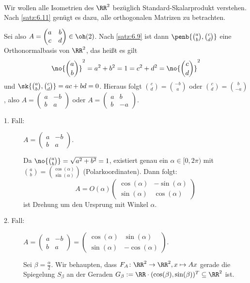 \begin{anwendung}
	\label{anw:6.12}
	Wir wollen alle Isometrien des $\RR^2$ bezüglich Standard-Skalarprodukt verstehen.
	Nach \autoref{satz:6.11} genügt es dazu, alle orthogonalen Matrizen zu betrachten.
	
	Sei also $A = \begin{pmatrix}
	 a & b \\ c & d
	\end{pmatrix} \in \oh(2)$.
	Nach \autoref{satz:6.9} ist dann $\penb{\binom{a}{b},\binom{c}{d}}$ eine Orthonormalbasis von $\RR^2$, das heißt es gilt
	\[
		\no{\binom{a}{b}}^2 = a^2 + b^2 = 1 = c^2 + d^2 = \no{\binom{c}{d}}^2
	\]
	und $\sk{\binom{a}{b},\binom{c}{d}} = ac + bd = 0$.
	Hieraus folgt $\binom{c}{d} = \binom{-b}{a}$ oder $\binom{c}{d} = \binom{b}{-a}$, also $A = \begin{pmatrix}
	a & -b \\ b & a
	\end{pmatrix}$ oder $A = \begin{pmatrix}
	a & b \\ b & -a
	\end{pmatrix}$.
	\begin{description}
		\item[1. Fall:] $A = \begin{pmatrix}
		a & -b \\ b & a
		\end{pmatrix}$.
		
		Da $\no{\binom{a}{b}} = \sqrt{a^2+b^2}=1$, existiert genau ein $\alpha \in [0,2\pi)$ mit $\binom{a}{b} = \binom{\cos(\alpha)}{\sin(\alpha)}$ (Polarkoordinaten).
		Dann folgt:
		\[
		 A = O(\alpha) \begin{pmatrix}
		 \cos(\alpha) & -\sin(\alpha) \\ \sin(\alpha) & \cos(\alpha)
		 \end{pmatrix}
		\]
		ist Drehung um den Ursprung mit Winkel $\alpha$.
		\item[2. Fall:] $A = \begin{pmatrix}
		a & -b \\ b & a
		\end{pmatrix} = \begin{pmatrix}
		\cos(\alpha) & \sin(\alpha) \\ \sin(\alpha) & -\cos(\alpha)
		\end{pmatrix}$.
		
		Sei $\beta = \frac{\alpha}{2}$.
		Wir behaupten, dass $F_A\colon \RR^2 \rightarrow \RR^2, x \mapsto Ax$ gerade die Spiegelung $S_\beta$ an der Geraden $G_\beta := \RR \cdot (\cos(\beta),\sin(\beta))^T \subseteq \RR^2$ ist.
		

\end{description}
\end{anwendung}
